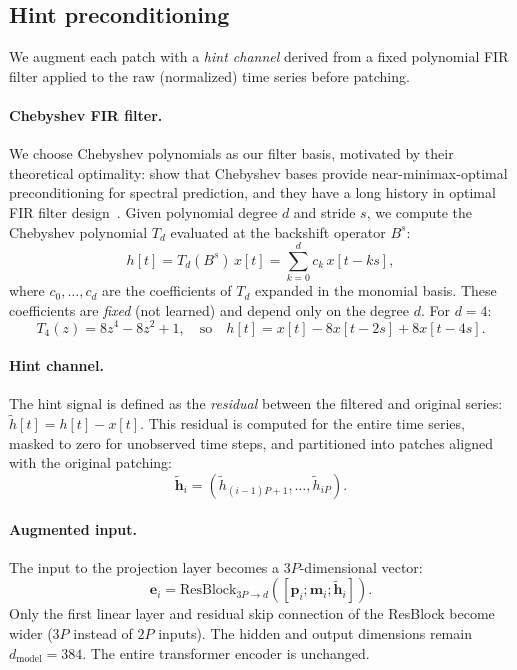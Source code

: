 \documentclass[11pt]{article}
\begin{document}
\subsection{Hint preconditioning}

We augment each patch with a \emph{hint channel} derived from a fixed polynomial FIR filter applied to the raw (normalized) time series before patching.

\paragraph{Chebyshev FIR filter.} We choose Chebyshev polynomials as our filter basis, motivated by their theoretical optimality: \citet{marsden2024universal} show that Chebyshev bases provide near-minimax-optimal preconditioning for spectral prediction, and they have a long history in optimal FIR filter design~\citep{parks1972chebyshev,mcclellan1973program}. Given polynomial degree $d$ and stride $s$, we compute the Chebyshev polynomial $T_d$ evaluated at the backshift operator $B^s$:
\begin{equation}
h[t] = T_d(B^s) \, x[t] = \sum_{k=0}^{d} c_k \, x[t - ks],
\end{equation}
where $c_0, \ldots, c_d$ are the coefficients of $T_d$ expanded in the monomial basis. These coefficients are \emph{fixed} (not learned) and depend only on the degree $d$. For $d=4$:
\begin{equation}
T_4(z) = 8z^4 - 8z^2 + 1, \quad \text{so} \quad h[t] = x[t] - 8 x[t-2s] + 8 x[t-4s].
\end{equation}

\paragraph{Hint channel.} The hint signal is defined as the \emph{residual} between the filtered and original series: $\tilde{h}[t] = h[t] - x[t]$. This residual is computed for the entire time series, masked to zero for unobserved time steps, and partitioned into patches aligned with the original patching:
\begin{equation}
\tilde{\mathbf{h}}_i = (\tilde{h}_{(i-1)P+1}, \ldots, \tilde{h}_{iP}).
\end{equation}

\paragraph{Augmented input.} The input to the projection layer becomes a $3P$-dimensional vector:
\begin{equation}
\mathbf{e}_i = \text{ResBlock}_{3P \to d}([\mathbf{p}_i; \mathbf{m}_i; \tilde{\mathbf{h}}_i]).
\end{equation}
Only the first linear layer and residual skip connection of the ResBlock become wider ($3P$ instead of $2P$ inputs). The hidden and output dimensions remain $d_{\text{model}} = 384$. The entire transformer encoder is unchanged.
\end{document}
